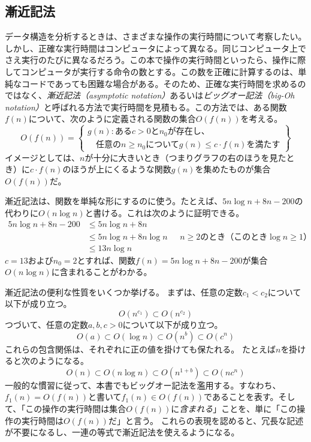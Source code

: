 \subsection{漸近記法}

  
データ構造を分析するときは、さまざまな操作の実行時間について考察したい。しかし、正確な実行時間はコンピュータによって異なる。同じコンピュータ上でさえ実行のたびに異なるだろう。この本で操作の実行時間といったら、操作に際してコンピュータが実行する命令の数とする。この数を正確に計算するのは、単純なコードであっても困難な場合がある。そのため、正確な実行時間を求めるのではなく、\emph{漸近記法（asymptotic notation）}あるいは\emph{ビッグオー記法（big-Oh notation）}と呼ばれる方法で実行時間を見積もる。この方法では、ある関数$f(n)$について、次のように定義される関数の集合$O(f(n))$を考える。%
\[
   O(f(n)) = \left\{
     \begin{array}{l}
       g(n):\mbox{ある$c>0$と$n_0$が存在し、} \\
             \quad\mbox{任意の$n\ge n_0$について$g(n) \le c\cdot f(n)$を満たす}
     \end{array} \right\}
\]
イメージとしては、$n$が十分に大きいとき（つまりグラフの右のほうを見たとき）に$c\cdot f(n)$のほうが上にくるような関数$g(n)$を集めたものが集合$O(f(n))$だ。 %

漸近記法は、関数を単純な形にするのに使う。たとえば、$5n\log n + 8n - 200$の代わりに$O(n \log n)$と書ける。これは次のように証明できる。
\begin{align*}
       5n\log n + 8n - 200
        & \le 5n\log n + 8n \\
        & \le 5n\log n + 8n\log n & \mbox{ $n\ge 2$のとき（このとき$\log n \ge 1$）}
            \\
        & \le 13n\log n
\end{align*}
$c = 13$および$n_0 = 2$とすれば、関数$f(n)= 5n \log n + 8n-200$が集合$O(n \log n)$に含まれることがわかる。

漸近記法の便利な性質をいくつか挙げる。
まずは、任意の定数$c_1 < c_2$について以下が成り立つ。
\[ O(n^{c_1}) \subset O(n^{c_2}) \]
つづいて、任意の定数$ a, b, c> 0 $について以下が成り立つ。
\[ O(a) \subset O(\log n) \subset O(n^{b}) \subset O({c}^n) \]
これらの包含関係は、それぞれに正の値を掛けても保たれる。
たとえば$n$を掛けると次のようになる。
\[ O(n) \subset O(n\log n) \subset O(n^{1+b}) \subset O(n{c}^n) \]
一般的な慣習に従って、本書でもビッグオー記法を濫用する。すなわち、$f_1(n) = O(f(n))$と書いて$f_1(n) \in O(f(n))$であることを表す。そして、「この操作の実行時間は集合$O(f(n))$に\emph{含まれる}」ことを、単に「この操作の実行時間は$O(f(n))$だ」と言う。
これらの表現を認めると、冗長な記述が不要になるし、一連の等式で漸近記法を使えるようになる。

